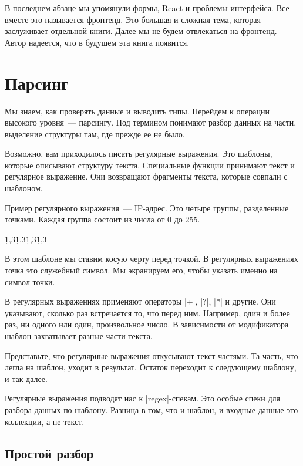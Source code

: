 В последнем абзаце мы упомянули формы, React и проблемы интерфейса. Все вместе
это называется фронтенд. Это большая и сложная тема, которая заслуживает
отдельной книги. Далее мы не будем отвлекаться на фронтенд. Автор надеется, что
в будущем эта книга появится.

\section{Парсинг}

Мы знаем, как проверять данные и выводить типы. Перейдем к операции высокого
уровня~--- парсингу. Под термином понимают разбор данных на части, выделение
структуры там, где прежде ее не было.

Возможно, вам приходилось писать регулярные выражения. Это шаблоны, которые
описывают структуру текста. Специальные функции принимают текст и регулярное
выражение. Они возвращают фрагменты текста, которые совпали с шаблоном.

Пример регулярного выражения~--- IP-адрес. Это четыре группы, разделенные
точками. Каждая группа состоит из числа от 0 до 255.

\begin{english}
  \begin{clojure}
\d{1,3}\.\d{1,3}\.\d{1,3}\.\d{1,3}
  \end{clojure}
\end{english}

В этом шаблоне мы ставим косую черту перед точкой. В регулярных выражениях точка
это служебный символ. Мы экранируем его, чтобы указать именно на символ точки.

В регулярных выражениях применяют операторы \spverb|+|, \spverb|?|, \spverb|*| и
другие. Они указывают, сколько раз встречается то, что перед ним. Например, один
и более раз, ни одного или один, произвольное число. В зависимости от
модификатора шаблон захватывает разные части текста.

Представьте, что регулярные выражения откусывают текст частями. Та часть, что
легла на шаблон, уходит в результат. Остаток переходит к следующему шаблону, и
так далее.

Регулярные выражения подводят нас к \spverb|regex|-спекам. Это особые спеки для
разбора данных по шаблону. Разница в том, что и шаблон, и входные данные это
коллекции, а не текст.

\subsection{Простой разбор}

